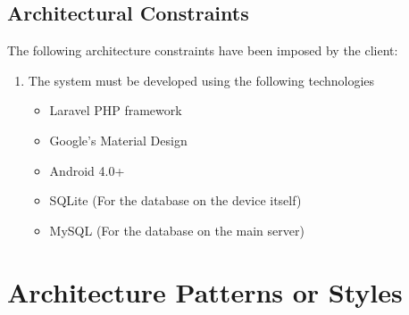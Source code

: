 \documentclass[hidelinks,a4paper,12pt]{article}
\begin{document}
\subsection{Architectural Constraints}		
	The following architecture constraints have been imposed by the client:
		\begin{enumerate}
			\item The system must be developed using the following technologies
			\begin{itemize}
				\item Laravel PHP framework
				\item Google's Material Design
				\item Android 4.0+
				\item SQLite (For the database on the device itself)
				\item MySQL (For the database on the main server)
			\end{itemize}
		\end{enumerate}
\newpage
\section{Architecture Patterns or Styles}
\end{document}
